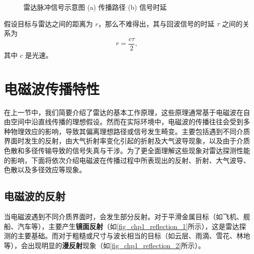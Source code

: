 \begin{figure}[htb!]
\begin{subfigure}{.8\textwidth}
        \caption{}
        \label{fig_chp1_radar_pulse_2}
    \end{subfigure}
    \caption{雷达脉冲信号示意图 (a) 传播路径 (b) 信号时延}
    \label{fig_chp1_radar_pulse}
\end{figure}

假设目标与雷达之间的距离为 $r$，那么不难得出，其与回波信号的时延 $\tau$ 之间的关系为
\begin{equation}
    r = \frac{c \tau}{2},
    \label{eq:radar_time_delay}
\end{equation}
其中 $c$ 是光速。

\section{电磁波传播特性}

在上一节中，我们简要介绍了雷达的基本工作原理，这些原理通常基于电磁波在自由空间中沿直线传播的理想假设。然而在实际环境中，电磁波的传播往往会受到多种物理效应的影响，导致其偏离理想路径或信号发生畸变。主要包括遇到不同介质界面时发生的反射，由大气折射率变化引起的折射及大气波导现象，以及由于介质色散和多径传输导致的信号失真与干涉。为了更全面理解这些现象对雷达探测性能的影响，下面将依次介绍电磁波在传播过程中所表现出的反射、折射、大气波导、色散以及多径效应等现象。



\subsection{电磁波的反射}

当电磁波遇到不同介质界面时，会发生部分反射。对于平滑金属目标（如飞机、舰船、汽车等），主要产生\textbf{镜面反射}（如\cref{fig_chp1_reflection_1}所示），这是雷达探测的主要基础。而对于粗糙或尺寸与波长相当的目标（如云层、雨滴、雪花、林地等），会出现明显的\textbf{漫反射}现象（如\cref{fig_chp1_reflection_2}所示）。

